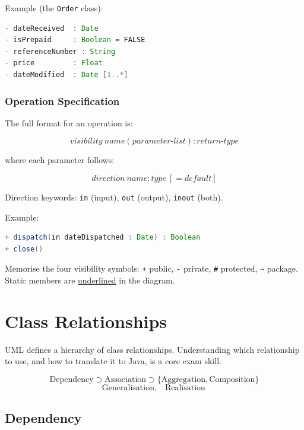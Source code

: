 \documentclass[11pt, a4paper, notitlepage]{report}
\theoremstyle{definition}
\theoremstyle{remark}
\theoremstyle{definition}
\begin{document}
Example (the \texttt{Order} class):
\begin{lstlisting}[language=Java,caption={Order class attributes}]
- dateReceived  : Date
- isPrepaid     : Boolean = FALSE
- referenceNumber : String
- price         : Float
- dateModified  : Date [1..*]
\end{lstlisting}

\subsubsection{Operation Specification}

The full format for an operation is:

\[
  \textit{visibility}\ \textit{name}(\textit{parameter-list}) : \textit{return-type}
\]

where each parameter follows:

\[
  \textit{direction}\ \textit{name} : \textit{type}\ [= \textit{default}]
\]

Direction keywords: \texttt{in} (input), \texttt{out} (output),
\texttt{inout} (both).

Example:
\begin{lstlisting}[language=Java]
+ dispatch(in dateDispatched : Date) : Boolean
+ close()
\end{lstlisting}

\begin{examtip}[title={Exam Tip: Visibility Symbols}]
  Memorise the four visibility symbols:
  \texttt{+} public, \texttt{-} private, \texttt{\#} protected,
  \texttt{\textasciitilde} package.  Static members are \underline{underlined}
  in the diagram.
\end{examtip}

\section{Class Relationships}
\label{sec:ch6-relationships}

UML defines a hierarchy of class relationships.  Understanding which
relationship to use, and how to translate it to Java, is a core exam skill.

\[
  \text{Dependency} \supset \text{Association} \supset
  \{\text{Aggregation}, \text{Composition}\}
\]
\[
  \text{Generalisation},\quad \text{Realisation}
\]

\subsection{Dependency}
\label{subsec:ch6-dependency}
\end{document}
